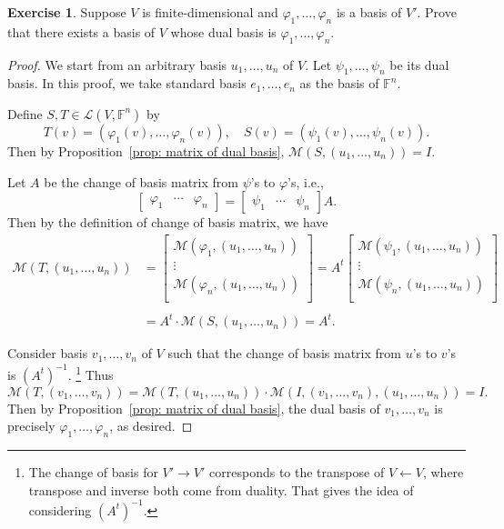 \documentclass{tufte-handout}
\theoremstyle{plain} %
\theoremstyle{definition}
\newtheorem{exer}[thm]{Exercise}
\theoremstyle{remark}
\newcommand{\bra}[1]{\mathopen{}\left(#1\right)}
\renewcommand{\phi}{\varphi}
\newcommand{\F}{\mathbb{F}}
\renewcommand{\L}{\mathcal{L}}
\newcommand{\M}{\mathcal{M}}
\renewcommand{\intercal}{t}
\begin{document}
\begin{exer}
	Suppose $V$ is finite-dimensional and $\phi_1,\dots,\phi_n$ is a basis of $V'$. Prove that there exists a basis of $V$ whose dual basis is $\phi_1,\dots,\phi_n$.
\end{exer}
\begin{proof}
	We start from an arbitrary basis $u_1,\dots,u_n$ of $V$. Let $\psi_1,\dots,\psi_n$ be its dual basis. In this proof, we take standard basis $e_1,\dots,e_n$ as the basis of $\F^n$.
	
	Define $S,T\in\L\bra{V,\F^n}$ by
	\[T(v)=\bra{\phi_1(v),\dots,\phi_n(v)},\quad S(v)=\bra{\psi_1(v),\dots,\psi_n(v)}.\]
	Then by Proposition~\ref{prop: matrix of dual basis}, $\M\bra{S,\bra{u_1,\dots,u_n}}=I$.
	
	Let $A$ be the change of basis matrix from $\psi$'s to $\phi$'s, i.e.,
	\[\begin{bmatrix}\phi_1&\cdots&\phi_n\end{bmatrix}=\begin{bmatrix}\psi_1&\cdots&\psi_n\end{bmatrix}A.\]
	Then by the definition of change of basis matrix, we have
	\begin{align*}
		\M\bra{T,\bra{u_1,\dots,u_n}}&=\begin{bmatrix}
			\M\bra{\phi_1,\bra{u_1,\dots,u_n}}\\
			\vdots\\
			\M\bra{\phi_n,\bra{u_1,\dots,u_n}}\\
		\end{bmatrix}
		=A^\intercal\begin{bmatrix}
			\M\bra{\psi_1,\bra{u_1,\dots,u_n}}\\
			\vdots\\
			\M\bra{\psi_n,\bra{u_1,\dots,u_n}}\\
		\end{bmatrix}\\\\
		&=A^\intercal\cdot\M\bra{S,\bra{u_1,\dots,u_n}}=A^\intercal.
	\end{align*}

	Consider basis $v_1,\dots,v_n$ of $V$ such that the change of basis matrix from $u$'s to $v$'s is $\bra{A^\intercal}^{-1}$.%
    \footnote{The change of basis for $V'\to V'$ corresponds to the transpose of $V\leftarrow V$, where transpose and inverse both come from duality. That gives the idea of considering $\bra{A^\intercal}^{-1}$.}
	Thus
	\[\M\bra{T,\bra{v_1,\dots,v_n}}=\M\bra{T,\bra{u_1,\dots,u_n}}\cdot\M\bra{I,\bra{v_1,\dots,v_n},\bra{u_1,\dots,u_n}}=I.\]
	Then by Proposition~\ref{prop: matrix of dual basis}, the dual basis of $v_1,\dots,v_n$ is precisely $\phi_1,\dots,\phi_n$, as desired.
\end{proof}
\end{document}
